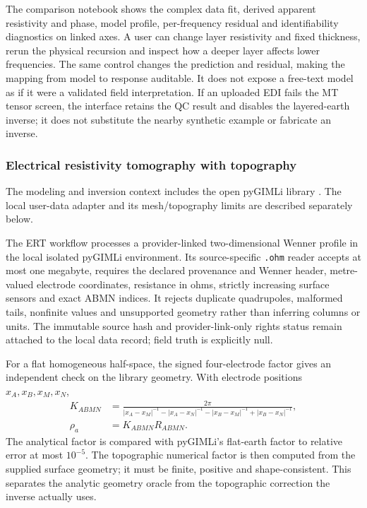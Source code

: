 The comparison notebook shows the complex data fit, derived apparent
resistivity and phase, model profile, per-frequency residual and
identifiability diagnostics on linked axes. A user can change layer
resistivity and fixed thickness, rerun the physical recursion and inspect
how a deeper layer affects lower frequencies. The same control changes
the prediction and residual, making the mapping from model to response
auditable. It does not expose a free-text model as if it were a validated
field interpretation. If an uploaded EDI fails the MT tensor screen, the
interface retains the QC result and disables the layered-earth inverse; it does not substitute
the nearby synthetic example or fabricate an inverse.

\subsubsection{Electrical resistivity tomography with topography}

The modeling and inversion context includes the open pyGIMLi library \cite{ruecker2017}. The local user-data adapter and its mesh/topography limits are described separately below.\label{method-ert}

The ERT workflow processes a provider-linked two-dimensional Wenner profile in the
local isolated pyGIMLi environment. Its source-specific \texttt{.ohm}
reader accepts at most one megabyte, requires the declared provenance and
Wenner header, metre-valued electrode coordinates, resistance in ohms,
strictly increasing surface sensors and exact ABMN indices. It rejects
duplicate quadrupoles, malformed tails, nonfinite values and unsupported
geometry rather than inferring columns or units. The immutable source
hash and provider-link-only rights status remain attached to the local
data record; field truth is explicitly null.

For a flat homogeneous half-space, the signed four-electrode factor gives
an independent check on the library geometry. With electrode positions
\(x_A,x_B,x_M,x_N\),
\begin{equation}\label{eq:ert-flat-factor}
 \begin{aligned}
 K_{ABMN}&=\frac{2\pi}{
 |x_A-x_M|^{-1}-|x_A-x_N|^{-1}-|x_B-x_M|^{-1}+|x_B-x_N|^{-1}},\\
 \rho_a&=K_{ABMN}R_{ABMN}.
 \end{aligned}
\end{equation}
The analytical factor is compared with pyGIMLi's flat-earth factor to
relative error at most \(10^{-5}\). The topographic numerical factor is
then computed from the supplied surface geometry; it must be finite,
positive and shape-consistent. This separates the analytic geometry
oracle from the topographic correction the inverse actually uses.

